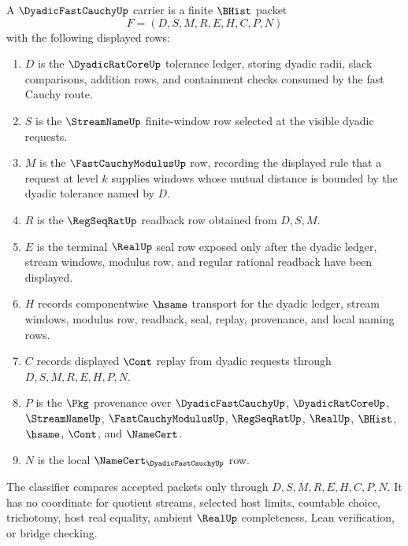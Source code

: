 \begin{definition}\label{def:dyadic-fast-cauchy-carrier}
A $\DyadicFastCauchyUp$ carrier is a finite $\BHist$ packet
$$
F=(D,S,M,R,E,H,C,P,N)
$$
with the following displayed rows:
\begin{enumerate}
\item $D$ is the $\DyadicRatCoreUp$ tolerance ledger, storing dyadic radii, slack comparisons, addition rows, and containment checks consumed by the fast Cauchy route.
\item $S$ is the $\StreamNameUp$ finite-window row selected at the visible dyadic requests.
\item $M$ is the $\FastCauchyModulusUp$ row, recording the displayed rule that a request at level $k$ supplies windows whose mutual distance is bounded by the dyadic tolerance named by $D$.
\item $R$ is the $\RegSeqRatUp$ readback row obtained from $D,S,M$.
\item $E$ is the terminal $\RealUp$ seal row exposed only after the dyadic ledger, stream windows, modulus row, and regular rational readback have been displayed.
\item $H$ records componentwise $\hsame$ transport for the dyadic ledger, stream windows, modulus row, readback, seal, replay, provenance, and local naming rows.
\item $C$ records displayed $\Cont$ replay from dyadic requests through $D,S,M,R,E,H,P,N$.
\item $P$ is the $\Pkg$ provenance over $\DyadicFastCauchyUp$, $\DyadicRatCoreUp$, $\StreamNameUp$, $\FastCauchyModulusUp$, $\RegSeqRatUp$, $\RealUp$, $\BHist$, $\hsame$, $\Cont$, and $\NameCert$.
\item $N$ is the local $\NameCert_{\DyadicFastCauchyUp}$ row.
\end{enumerate}
The classifier compares accepted packets only through $D,S,M,R,E,H,C,P,N$. It has no coordinate for quotient streams, selected host limits, countable choice, trichotomy, host real equality, ambient $\RealUp$ completeness, Lean verification, or bridge checking.
\end{definition}

